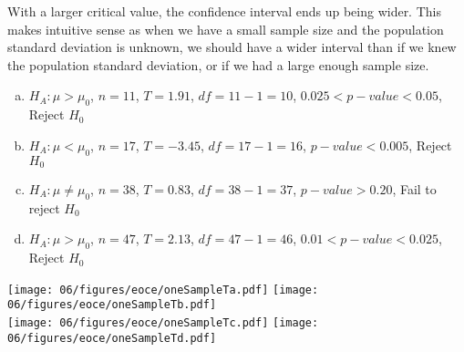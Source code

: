 
{
With a larger critical value, the confidence interval ends up being wider. This makes intuitive sense as when we have a small sample size and the population standard deviation is unknown, we should have a wider interval than if we knew the population standard deviation, or if we had a large enough sample size.
}


{
\begin{enumerate}[(a)]
\setlength{\itemsep}{0mm}
\item $H_A: \mu > \mu_0 $, $n = 11$, $T= 1.91$, $df = 11 - 1 = 10$, $0.025 < p-value < 0.05$, Reject $H_0$
\item $H_A: \mu < \mu_0 $, $n = 17$, $T = -3.45$, $df = 17 - 1 = 16$, $p-value < 0.005$, Reject $H_0$
\item $H_A: \mu \ne \mu_0 $, $n = 38$, $T = 0.83$, $df = 38 - 1 = 37$, $p-value > 0.20$, Fail to reject $H_0$
\item $H_A: \mu > \mu_0 $, $n = 47$, $T = 2.13$, $df = 47 - 1 = 46$, $0.01 < p-value < 0.025$, Reject $H_0$ \\
\end{enumerate}

\begin{center}
\texttt{[image: 06/figures/eoce/oneSampleTa.pdf]}
\texttt{[image: 06/figures/eoce/oneSampleTb.pdf]} \\
\texttt{[image: 06/figures/eoce/oneSampleTc.pdf]}
\texttt{[image: 06/figures/eoce/oneSampleTd.pdf]}
\end{center}
}

